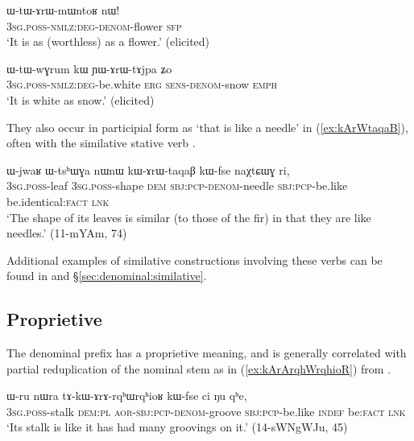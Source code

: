 \begin{exe}
\ex \label{ex:WtArWmWntoR}
\gll ɯ-tɯ-ɤrɯ-mɯntoʁ nɯ! \\
\textsc{3sg}.\textsc{poss}-\textsc{nmlz}:\textsc{deg}-\textsc{denom}-flower \textsc{sfp} \\
\glt `It is as (worthless) as a flower.' (elicited)
\end{exe}

 \begin{exe}
\ex \label{ex:YArWtAjpa}
\gll ɯ-tɯ-wɣrum kɯ ɲɯ-ɤrɯ-tɤjpa ʑo \\
\textsc{3sg}.\textsc{poss}-\textsc{nmlz}:\textsc{deg}-be.white \textsc{erg} \textsc{sens}-\textsc{denom}-snow \textsc{emph} \\
\glt `It is white as snow.' (elicited)
\end{exe}

They also occur in participial form as  `that is like a needle' in (\ref{ex:kArWtaqaB}), often with the similative stative verb .

\begin{exe}
\ex \label{ex:kArWtaqaB}
\gll ɯ-jwaʁ ɯ-tsʰɯɣa nɯnɯ kɯ-ɤrɯ-taqaβ kɯ-fse naχtɕɯɣ ri, \\
\textsc{3sg}.\textsc{poss}-leaf \textsc{3sg}.\textsc{poss}-shape \textsc{dem} \textsc{sbj}:\textsc{pcp}-\textsc{denom}-needle \textsc{sbj}:\textsc{pcp}-be.like be.identical:\textsc{fact} \textsc{lnk} \\
\glt `The shape of its leaves is similar (to those of the fir) in that they are like needles.' (11-mYAm, 74)
\end{exe}

Additional examples of similative constructions involving these verbs can be found in  \citet{jacques18similative} and §\ref{sec:denominal:similative}.

\subsection{Proprietive  }  \label{sec:denom.arA}
The  denominal prefix has a proprietive meaning, and is generally correlated with partial reduplication of the nominal stem as in  (\ref{ex:kArArqhWrqhioR}) from .


\begin{exe}
\ex \label{ex:kArArqhWrqhioR}
\gll ɯ-ru nɯra tɤ-kɯ-ɤrɤ-rqʰɯ\redp{}rqʰioʁ kɯ-fse ci ŋu qʰe, \\
\textsc{3sg}.\textsc{poss}-stalk \textsc{dem}:\textsc{pl} \textsc{aor}-\textsc{sbj}:\textsc{pcp}-\textsc{denom}-groove \textsc{sbj}:\textsc{pcp}-be.like \textsc{indef} be:\textsc{fact} \textsc{lnk} \\
\glt `Its stalk is like it has had many groovings on it.' (14-sWNgWJu, 45)
\end{exe}

